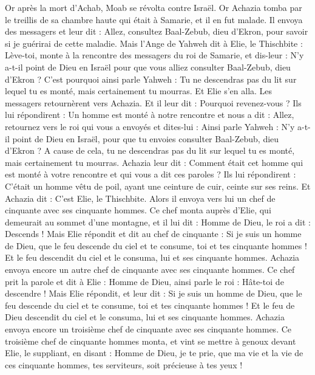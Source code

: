 \begin{multicols}{2}
\VerseOne{}Or après la mort d'Achab, Moab se révolta contre Israël.
Or Achazia tomba par le treillis de sa chambre haute qui était à Samarie, et il en fut malade. Il envoya des messagers et leur dit : Allez, consultez Baal-Zebub, dieu d'Ekron, pour savoir si je guérirai de cette maladie.
Mais l'Ange de Yahweh dit à Elie, le Thischbite : Lève-toi, monte à la rencontre des messagers du roi de Samarie, et dis-leur : N'y a-t-il point de Dieu en Israël pour que vous alliez consulter Baal-Zebub, dieu d'Ekron ?
C'est pourquoi ainsi parle Yahweh : Tu ne descendras pas du lit sur lequel tu es monté, mais certainement tu mourras. Et Elie s'en alla.
Les messagers retournèrent vers Achazia. Et il leur dit : Pourquoi revenez-vous ?
Ils lui répondirent : Un homme est monté à notre rencontre et nous a dit : Allez, retournez vers le roi qui vous a envoyés et dites-lui : Ainsi parle Yahweh : N'y a-t-il point de Dieu en Israël, pour que tu envoies consulter Baal-Zebub, dieu d'Ekron ? A cause de cela, tu ne descendras pas du lit sur lequel tu es monté, mais certainement tu mourras.
Achazia leur dit : Comment était cet homme qui est monté à votre rencontre et qui vous a dit ces paroles ?
Ils lui répondirent : C'était un homme vêtu de poil, ayant une ceinture de cuir, ceinte sur ses reins. Et Achazia dit : C'est Elie, le Thischbite.
Alors il envoya vers lui un chef de cinquante avec ses cinquante hommes. Ce chef monta auprès d'Elie, qui demeurait au sommet d'une montagne, et il lui dit : Homme de Dieu, le roi a dit : Descends !
Mais Elie répondit et dit au chef de cinquante : Si je suis un homme de Dieu, que le feu descende du ciel et te consume, toi et tes cinquante hommes ! Et le feu descendit du ciel et le consuma, lui et ses cinquante hommes.
Achazia envoya encore un autre chef de cinquante avec ses cinquante hommes. Ce chef prit la parole et dit à Elie : Homme de Dieu, ainsi parle le roi : Hâte-toi de descendre !
Mais Elie répondit, et leur dit : Si je suis un homme de Dieu, que le feu descende du ciel et te consume, toi et tes cinquante hommes ! Et le feu de Dieu descendit du ciel et le consuma, lui et ses cinquante hommes.
Achazia envoya encore un troisième chef de cinquante avec ses cinquante hommes. Ce troisième chef de cinquante hommes monta, et vint se mettre à genoux devant Elie, le suppliant, en disant : Homme de Dieu, je te prie, que ma vie et la vie de ces cinquante hommes, tes serviteurs, soit précieuse à tes yeux !

\end{multicols}
